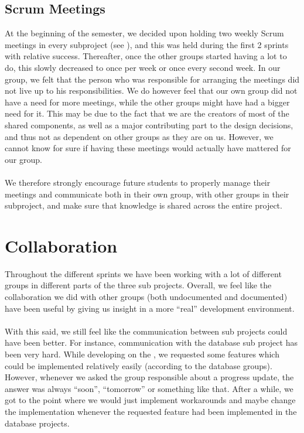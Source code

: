 \subsection{Scrum Meetings}
At the beginning of the semester, we decided upon holding two weekly Scrum meetings in every subproject (see ), and this was held during the first 2 sprints with relative success. Thereafter, once the other groups started having a lot to do, this slowly decreased to once per week or once every second week. In our group, we felt that the person who was responsible for arranging the meetings did not live up to his responsibilities. We do however feel that our own group did not have a need for more meetings, while the other groups might have had a bigger need for it. This may be due to the fact that we are the creators of most of the shared components, as well as a major contributing part to the design decisions, and thus not as dependent on other groups as they are on us. However, we cannot know for sure if having these meetings would actually have mattered for our group.
\\\\ 
We therefore strongly encourage future students to properly manage their meetings and communicate both in their own group, with other groups in their subproject, and make sure that knowledge is shared across the entire project.

\section{Collaboration}
Throughout the different sprints we have been working with a lot of different groups in different parts of the three sub projects. Overall, we feel like the collaboration we did with other groups (both undocumented and documented) have been useful by giving us insight in a more ``real'' development environment.
\\\\
With this said, we still feel like the communication between sub projects could have been better. For instance, communication with the database sub project has been very hard. While developing on the \ct, we requested some features which could be implemented relatively easily (according to the database groups). However, whenever we asked the group responsible about a progress update, the answer was always ``soon'', ``tomorrow'' or something like that. After a while, we got to the point where we would just implement workarounds and maybe change the implementation whenever the requested feature had been implemented in the database projects. 

